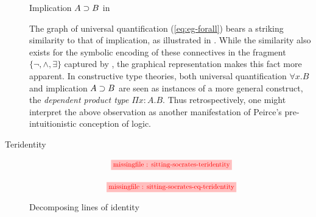 \begin{description}
  \begin{marginfigure}
    \begin{center}
    \end{center}
    \caption{Implication $A \supset B$ in }
  \end{marginfigure}
  
  \begin{remark}
    
    The graph of universal quantification (\ref{eq:eg-forall}) bears a striking
    similarity to that of implication, as illustrated in .
    While the similarity also exists for the symbolic encoding of these
    connectives in the fragment $\{\neg, \land, \exists\}$ captured by
    , the graphical representation makes this fact more apparent. In
    constructive type theories, both universal quantification $\forall x. B$ and
    implication $A \supset B$ are seen as instances of a more general construct,
    the \emph{dependent product type} $\Pi x : A. B$. Thus retrospectively, one
    might interpret the above observation as another manifestation of Peirce's
    pre-intuitionistic conception of logic.
  \end{remark}

  \item[Teridentity]
  
  \begin{marginfigure}
    \begin{gather}
    \tikzfig{0.8}{0.5}{sitting-socrates-teridentity} \label{eq:sitting-socrates-teridentity} \\[1em]
    \tikzfig{0.8}{0.5}{sitting-socrates-eq-teridentity} \label{eq:sitting-socrates-eq-teridentity}
    \end{gather}
    \caption{Decomposing lines of identity}
  \end{marginfigure}


\end{description}
